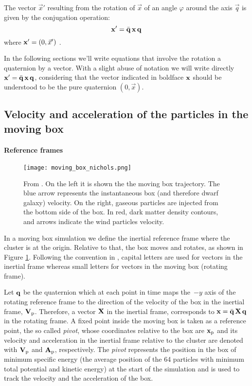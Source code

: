 The vector $\vec x'$ resulting from the rotation of $\vec x$ of an angle $\varphi$ around the axis $\vec q$ is given by the conjugation operation:
\begin{equation}
\boldsymbol{\mathbf{x}}' = \bar{\mathbf{q}}\, \boldsymbol{\mathbf{x}} \, \mathbf{q} 
\end{equation}
where $\boldsymbol{\mathbf{x}}' = (0, \vec x')$ \citep[for a proof, see e.g.][sec. 1.4]{Graf2008}.

In the following sections we'll write equations that involve the rotation a quaternion by a vector.
With a slight abuse of notation we will write directly $\boldsymbol{\mathbf{x}}' = \bar{\mathbf{q}}\, \boldsymbol{\mathbf{x}} \, \mathbf{q}$, considering that the vector indicated in boldface $\boldsymbol{\mathbf{x}}$ should be understood to be the pure quaternion $(0, \vec x)$.%



\subsection{Velocity and acceleration of the particles in the moving box}
\paragraph{Reference frames}
\begin{figure}[H]
 \centering
 \texttt{[image: moving\_box\_nichols.png]}
 \caption{From \citet{Nichols2015}. On the left it is shown the the moving box trajectory. The blue arrow represents the instantaneous box (and therefore dwarf galaxy) velocity.
 On the right, gaseous particles are injected from the bottom side of the box. In red, dark matter density contours, and arrows indicate the wind particles velocity.}
 \label{fig:mb_nichols}
\end{figure}
In a moving box simulation we define the inertial reference frame where the cluster is at the origin.
Relative to that, the box moves and rotates, as shown in Figure \ref{fig:mb_nichols}.
Following the convention in \citet{Nichols2015}, capital letters are used for vectors in the inertial frame whereas small letters for vectors in the moving box (rotating frame).

Let $\mathbf{q}$ be the quaternion which at each point in time maps the~$-y$ axis of the rotating reference frame to the direction of the velocity of the box in the inertial frame, $\boldsymbol{\mathbf{V}}_{\mathrm p}$.
Therefore, a vector $\boldsymbol{\mathbf{X}}$ in the inertial frame, corresponds to $\boldsymbol{\mathbf{x}} = \bar{\mathbf{q}}\, \boldsymbol{\mathbf{X}} \,\mathbf{q} $ in the rotating frame.
A fixed point inside the moving box is taken as a reference point, the so called \emph{pivot}, whose coordinates relative to the box are $\boldsymbol{\mathbf{x}}_{\mathrm p}$ and its velocity and acceleration in the inertial frame relative to the cluster are denoted with $\boldsymbol{\mathbf{V}}_{\mathrm p}$ and $\boldsymbol{\mathbf{A}}_{\mathrm p}$, respectively.
The \emph{pivot} represents the position in the box of minimum specific energy (the average position of the 64 particles with minimum total potential and kinetic energy) at the start of the simulation and is used to track the velocity and the acceleration of the box.

